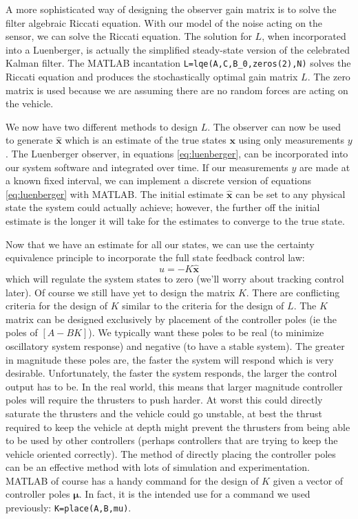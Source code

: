 \documentclass{article}
\begin{document}
A more sophisticated way of designing the observer gain matrix is to solve the filter algebraic Riccati equation.  With our model of the noise acting on the sensor, we can solve the Riccati equation.  The solution for $L$, when incorporated into a Luenberger, is actually the simplified steady-state version of the celebrated Kalman filter.  The MATLAB incantation \verb+L=lqe(A,C,B_0,zeros(2),N)+ solves the Riccati equation and produces the stochastically optimal gain matrix $L$.  The zero matrix is used because we are assuming there are no random forces are acting on the vehicle.

We now have two different methods to design $L$.  The observer can now be used to generate $\pmb{\hat{x}}$ which is an estimate of the true states $\pmb{x}$ using only measurements $y$.  The Luenberger observer, in equations \ref{eq:luenberger}, can be incorporated into our system software and integrated over time.  If our measurements $y$ are made at a known fixed interval, we can implement a discrete version of equations \ref{eq:luenberger} with MATLAB.  The initial estimate $\pmb{\hat{x}}$ can be set to any physical state the system could actually achieve; however, the further off the initial estimate is the longer it will take for the estimates to converge to the true state.   

%
%
%

Now that we have an estimate for all our states, we can use the certainty equivalence principle to incorporate the full state feedback control law: 
\begin{equation}
\label{eq:equivalencePrinciple}
u=-K\pmb{\hat{x}} 
\end{equation}
which will regulate the system states to zero (we'll worry about tracking control later).  Of course we still have yet to design the matrix $K$.  There are conflicting criteria for the design of $K$ similar to the criteria for the design of $L$.  The $K$ matrix can be designed exclusively by placement of the controller poles (ie the poles of $[A-BK]$).  We typically want these poles to be real (to minimize oscillatory system response) and negative (to have a stable system).  The greater in magnitude these poles are, the faster the system will respond which is very desirable.  Unfortunately, the faster the system responds, the larger the control output has to be.  In the real world, this means that larger magnitude controller poles will require the thrusters to push harder.  At worst this could directly saturate the thrusters and the vehicle could go unstable, at best the thrust required to keep the vehicle at depth might prevent the thrusters from being able to be used by other controllers (perhaps controllers that are trying to keep the vehicle oriented correctly).  The method of directly placing the controller poles can be an effective method with lots of simulation and experimentation.  MATLAB of course has a handy command for the design of $K$ given a vector of controller poles $\pmb{\mu}$.  In fact, it is the intended use for a command we used previously: \verb+K=place(A,B,mu)+.
\end{document}
